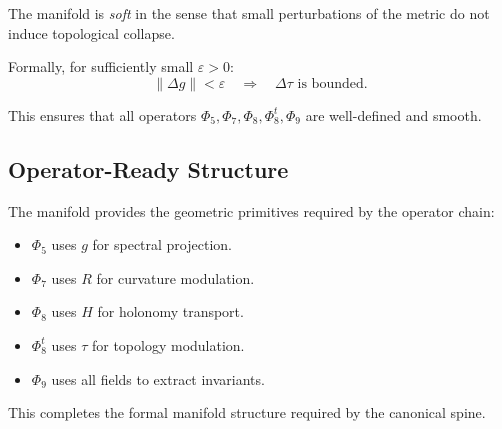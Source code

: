 The manifold is \emph{soft} in the sense that small perturbations of the metric
do not induce topological collapse.

Formally, for sufficiently small $\varepsilon > 0$:
\[
\| \Delta g \| < \varepsilon
\quad\Longrightarrow\quad
\Delta \tau \text{ is bounded}.
\]

This ensures that all operators $\Phi_5, \Phi_7, \Phi_8, \Phi_8^t, \Phi_9$ are
well-defined and smooth.

\subsection{Operator-Ready Structure}

The manifold provides the geometric primitives required by the operator chain:

\begin{itemize}
    \item $\Phi_5$ uses $g$ for spectral projection.
    \item $\Phi_7$ uses $R$ for curvature modulation.
    \item $\Phi_8$ uses $H$ for holonomy transport.
    \item $\Phi_8^t$ uses $\tau$ for topology modulation.
    \item $\Phi_9$ uses all fields to extract invariants.
\end{itemize}

This completes the formal manifold structure required by the canonical spine.
